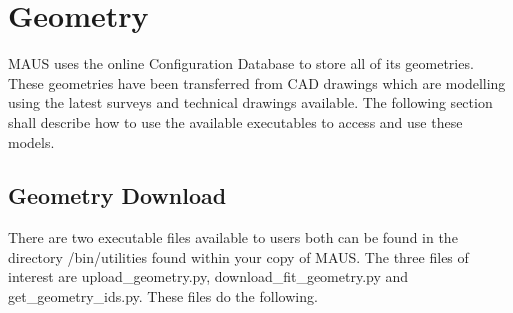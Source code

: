 \chapter{Geometry}
\label{chapter:geometry}
MAUS uses the online Configuration Database to store all of its geometries. These geometries have been transferred from CAD drawings which are
modelling using the latest surveys and technical drawings available. The following section shall describe how to use the available executables to
access and use these models. 

\section{Geometry Download}

There are two executable files available to users both can be found in the directory /bin/utilities found within your copy of MAUS. The three files of
interest are upload\_geometry.py, download\_fit\_geometry.py and get\_geometry\_ids.py. These files do the following.

